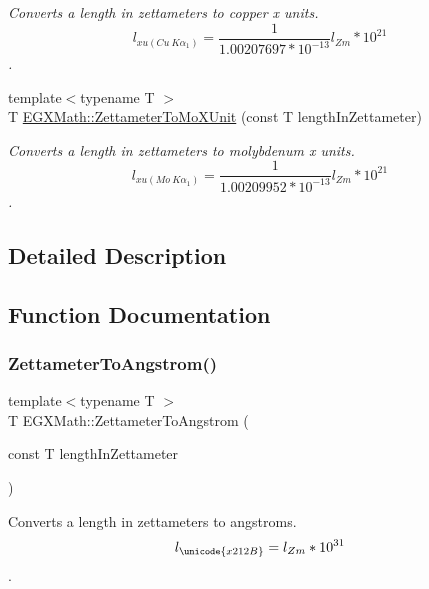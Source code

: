 \begin{DoxyCompactItemize}
\begin{DoxyCompactList}\small\item\em Converts a length in zettameters to copper x units. \[ l_{xu(Cu\ K\alpha_1)}= \frac{1}{1.00207697*10^{-13}} l_{Zm} * 10^{21}\]. \end{DoxyCompactList}\item 
{\footnotesize template$<$typename T $>$ }\\T \mbox{\hyperlink{group___e_g_x_math-_conversions-_length_conversions-_zettameter-_non-_s_i_ga10039261b7de3417e69110a56312b9ef}{E\+G\+X\+Math\+::\+Zettameter\+To\+Mo\+X\+Unit}} (const T length\+In\+Zettameter)
\begin{DoxyCompactList}\small\item\em Converts a length in zettameters to molybdenum x units. \[ l_{xu(Mo\ K\alpha_1)}=\frac{1}{1.00209952*10^{-13}} l_{Zm} * 10^{21}\]. \end{DoxyCompactList}\end{DoxyCompactItemize}


\subsection{Detailed Description}


\subsection{Function Documentation}
\mbox{\label{group___e_g_x_math-_conversions-_length_conversions-_zettameter-_non-_s_i_ga49d813ff9592fc1fc9a184436d0849fc}} 
\subsubsection{\texorpdfstring{Zettameter\+To\+Angstrom()}{ZettameterToAngstrom()}}
{\footnotesize\ttfamily template$<$typename T $>$ \\
T E\+G\+X\+Math\+::\+Zettameter\+To\+Angstrom (\begin{DoxyParamCaption}\item[{const T}]{length\+In\+Zettameter }\end{DoxyParamCaption})}



Converts a length in zettameters to angstroms. \[ l_{\unicode{x212B}}=l_{Zm} * 10^{31} \]. 

